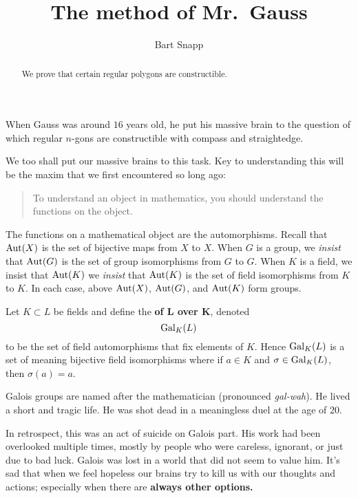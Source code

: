 \documentclass{ximera}
\title{The method of Mr.\ Gauss}
\author{Bart Snapp}
\begin{document}
\begin{abstract}
  We prove that certain regular polygons are constructible.
\end{abstract}
\maketitle

When Gauss was around $16$ years old, he put his massive brain to the
question of which regular $n$-gons are constructible with compass and
straightedge.


We too shall put our massive brains to this task. Key to understanding
this will be the maxim that we first encountered so long ago:
\begin{quote}
  To understand an object in mathematics, you should understand the
  functions on the object.
\end{quote}
The functions on a mathematical object are the automorphisms.  Recall
that $\operatorname{Aut}(X)$ is the set of bijective maps from
$X$ to $X$. When $G$ is a group, we \textit{insist} that $\operatorname{Aut}(G)$ is
the set of group isomorphisms from $G$ to $G$. When $K$ is a field, we
insist that $\operatorname{Aut}(K)$ we \textit{insist} that $\operatorname{Aut}(K)$ is the set of
field isomorphisms from $K$ to $K$. In each case, above $\operatorname{Aut}(X)$,
$\operatorname{Aut}(G)$, and $\operatorname{Aut}(K)$ form groups.



\begin{definition}
  Let $K\subset L$ be fields and define the \textbf{
    of $\boldsymbol L$ over $\boldsymbol K$}, denoted
  \[
  \operatorname{Gal}_K(L)
  \]
  to be the set of field automorphisms that fix elements of $K$. Hence
  $\operatorname{Gal}_K(L)$ is a set of meaning bijective field isomorphisms where if
  $a\in K$ and $\sigma \in \operatorname{Gal}_K(L)$, then $\sigma(a) = a$.
\end{definition}

Galois groups are named after the mathematician  (pronounced
\textit{gal-wah}). He lived a short and tragic life. He was shot dead
in a meaningless duel at the age of 20.

In retrospect, this was an act of suicide on Galois part. His work had
been overlooked multiple times, mostly by people who were careless,
ignorant, or just due to bad luck. Galois was lost in a world that did
not seem to value him.  It's sad that when we feel hopeless our brains
try to kill us with our thoughts and actions; especially when there
are \textbf{always other options.} 
\end{document}
